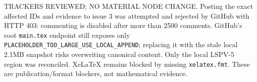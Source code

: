 \documentclass[11pt]{article}
\begin{document}
TRACKERS REVIEWED; NO MATERIAL NODE CHANGE.  Posting the exact affected IDs and evidence to issue 3 was attempted and rejected by GitHub with HTTP 403: commenting is disabled after more than 2500 comments.  GitHub's root \texttt{main.tex} endpoint still exposes only \texttt{PLACEHOLDER\_TOO\_LARGE\_USE\_LOCAL\_APPEND}; replacing it with the stale local 2.1MB snapshot risks overwriting canonical content.  Only the local LSPV-5 region was reconciled.  XeLaTeX remains blocked by missing \texttt{xelatex.fmt}.  These are publication/format blockers, not mathematical evidence.
\end{document}

